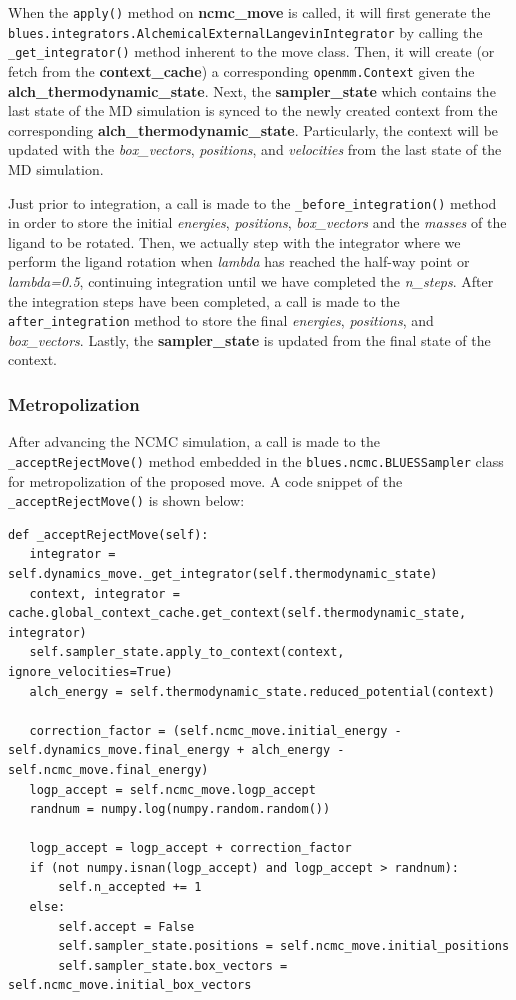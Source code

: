 When the \texttt{apply()} method on \textbf{ncmc\_move} is called, it will first generate the \texttt{blues.integrators.AlchemicalExternalLangevinIntegrator} by calling the \texttt{_get_integrator()} method inherent to the move class. 
Then, it will create (or fetch from the \textbf{context\_cache}) a corresponding \texttt{openmm.Context} given the \textbf{alch\_thermodynamic\_state}.
Next, the \textbf{sampler\_state} which contains the last state of the MD simulation is synced to the
newly created context from the corresponding \textbf{alch\_thermodynamic\_state}.
Particularly, the context will be updated with the \emph{box\_vectors}, \emph{positions}, and
\emph{velocities} from the last state of the MD simulation.

Just prior to integration, a call is made to the \texttt{_before_integration()} method in order to store the initial \emph{energies}, \emph{positions}, \emph{box\_vectors} and the \emph{masses} of the ligand to be rotated.
Then, we actually step with the integrator where we perform the ligand rotation when \emph{lambda} has reached the half-way point or \emph{lambda=0.5}, continuing integration until we have completed the \emph{n\_steps}.
After the integration steps have been completed, a call is made to the \texttt{after_integration} method to store the final \emph{energies}, \emph{positions}, and \emph{box\_vectors}.
Lastly, the \textbf{sampler\_state} is updated from the final state of the context.


\subsubsection{Metropolization}

After advancing the NCMC simulation, a call is made to the \texttt{_acceptRejectMove()} method embedded in the \texttt{blues.ncmc.BLUESSampler} class for metropolization of the proposed move.
A code snippet of the \texttt{_acceptRejectMove()} is shown below:

\begin{verbatim}
def _acceptRejectMove(self):
   integrator = self.dynamics_move._get_integrator(self.thermodynamic_state)
   context, integrator = cache.global_context_cache.get_context(self.thermodynamic_state, integrator)
   self.sampler_state.apply_to_context(context, ignore_velocities=True)
   alch_energy = self.thermodynamic_state.reduced_potential(context)

   correction_factor = (self.ncmc_move.initial_energy - self.dynamics_move.final_energy + alch_energy - self.ncmc_move.final_energy)
   logp_accept = self.ncmc_move.logp_accept
   randnum = numpy.log(numpy.random.random())

   logp_accept = logp_accept + correction_factor
   if (not numpy.isnan(logp_accept) and logp_accept > randnum):
       self.n_accepted += 1
   else:
       self.accept = False
       self.sampler_state.positions = self.ncmc_move.initial_positions
       self.sampler_state.box_vectors = self.ncmc_move.initial_box_vectors
\end{verbatim}

